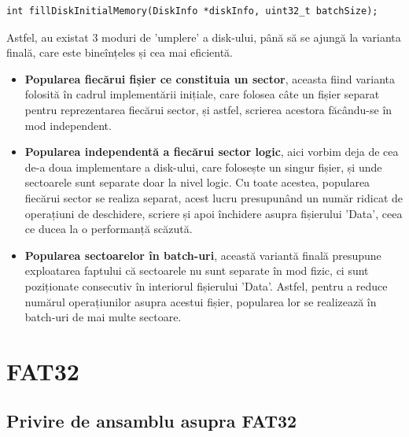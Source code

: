 \bigskip

\lstset{style=code-snyppet-style}
\begin{lstlisting}
int fillDiskInitialMemory(DiskInfo *diskInfo, uint32_t batchSize);
\end{lstlisting}

\bigskip

Astfel, au existat 3 moduri de 'umplere' a disk-ului, până să se ajungă la varianta finală, care este bineînțeles și cea mai eficientă.

\begin{itemize}
  \item \textbf{Popularea fiecărui fișier ce constituia un sector}, aceasta fiind varianta folosită în cadrul implementării inițiale, care folosea câte un fișier separat pentru reprezentarea fiecărui sector, și astfel, scrierea acestora făcându-se în mod independent.
  
  \item \textbf{Popularea independentă a fiecărui sector logic}, aici vorbim deja de cea de-a doua implementare a disk-ului, care folosește un singur fișier, și unde sectoarele sunt separate doar la nivel logic. Cu toate acestea, popularea fiecărui sector se realiza separat, acest lucru presupunând un număr ridicat de operațiuni de deschidere, scriere și apoi închidere asupra fișierului 'Data', ceea ce ducea la o performanță scăzută.
  
  \item \textbf{Popularea sectoarelor în batch-uri}, această variantă finală presupune exploatarea faptului că sectoarele nu sunt separate în mod fizic, ci sunt poziționate consecutiv în interiorul fișierului 'Data'. Astfel, pentru a reduce numărul operațiunilor asupra acestui fișier, popularea lor se realizează în batch-uri de mai multe sectoare.
  
\end{itemize}














\newpage

\section{FAT32}

\subsection{Privire de ansamblu asupra FAT32}

